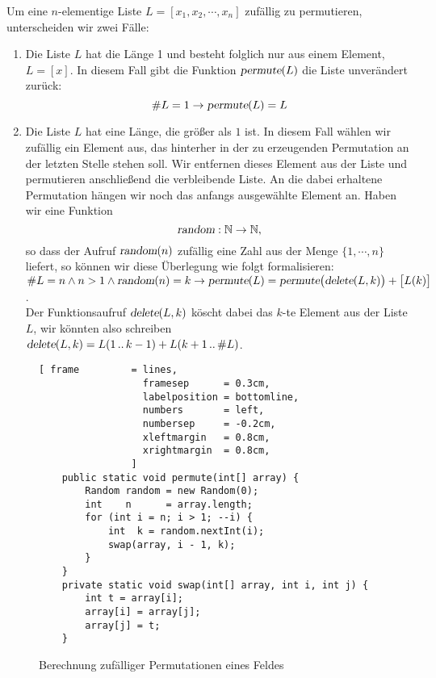 Um eine $n$-elementige Liste $L = [x_1,x_2, \cdots, x_n]$ zuf\"allig zu permutieren,
unterscheiden wir zwei F\"alle:
\begin{enumerate}
\item Die Liste $L$ hat die L\"ange 1 und besteht folglich nur aus einem Element, $L = [x]$.
      In diesem Fall gibt die Funktion $\textsl{permute}(L)$ die Liste unver\"andert zur\"uck:
      \[ \#L = 1 \rightarrow \textsl{permute}(L) = L \]
\item Die Liste $L$ hat eine L\"ange, die gr\"o{\ss}er als $1$ ist.  In diesem Fall w\"ahlen wir
      zuf\"allig ein Element aus, das hinterher  in der zu erzeugenden Permutation an der letzten Stelle
      stehen soll.  Wir entfernen dieses Element aus der Liste und permutieren
      anschlie{\ss}end die verbleibende Liste.  An die dabei erhaltene Permutation h\"angen wir
      noch das anfangs ausgew\"ahlte Element an.  Haben wir eine Funktion
      \[ \textsl{random}: \mathbb{N} \rightarrow \mathbb{N}, \]
      so dass der Aufruf $\textsl{random}(n)$ zuf\"allig eine Zahl aus der Menge $\{1,\cdots,n\}$
      liefert, so k\"onnen wir diese \"Uberlegung wie folgt formalisieren:
      \\[0.2cm]
      \hspace*{1.3cm}
      $ \#L = n \wedge n > 1 \wedge \textsl{random}(n) = k \rightarrow 
         \textsl{permute}(L) = \textsl{permute}\bigl(\textsl{delete}(L,k)\bigr) + \bigl[ L(k)
         \bigr]
      $.
\\[0.2cm]
      Der  Funktionsaufruf $\textsl{delete}(L,k)$ k\"oscht dabei das $k$-te Element aus der Liste $L$,
      wir k\"onnten also schreiben
      \\[0.2cm]
      \hspace*{1.3cm}
      $\textsl{delete}(L,k) = L(1\,..\,k-1) + L(k+1\,..\,\#L)$.
\end{enumerate}

\begin{figure}[!ht]
\centering
\begin{Verbatim}[ frame         = lines, 
                  framesep      = 0.3cm, 
                  labelposition = bottomline,
                  numbers       = left,
                  numbersep     = -0.2cm,
                  xleftmargin   = 0.8cm,
                  xrightmargin  = 0.8cm,
                ]
    public static void permute(int[] array) {
        Random random = new Random(0);
        int    n      = array.length;
        for (int i = n; i > 1; --i) {
            int  k = random.nextInt(i);
            swap(array, i - 1, k);
        }
    }
    private static void swap(int[] array, int i, int j) {
        int t = array[i];
        array[i] = array[j];
        array[j] = t;
    }
\end{Verbatim}
\vspace*{-0.3cm}
\caption{Berechnung zuf\"alliger Permutationen eines Feldes}
\label{fig:RandomPermutation.java}
\end{figure}

